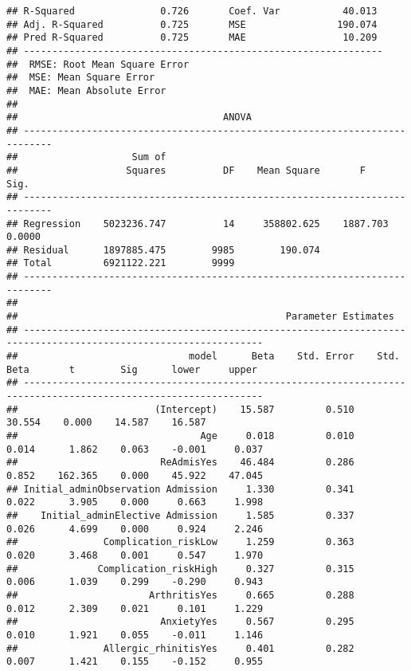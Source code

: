 \documentclass[
]{article}
\begin{document}
\begin{verbatim}
## R-Squared               0.726       Coef. Var           40.013 
## Adj. R-Squared          0.725       MSE                190.074 
## Pred R-Squared          0.725       MAE                 10.209 
## ---------------------------------------------------------------
##  RMSE: Root Mean Square Error 
##  MSE: Mean Square Error 
##  MAE: Mean Absolute Error 
## 
##                                    ANOVA                                    
## ---------------------------------------------------------------------------
##                    Sum of                                                  
##                   Squares          DF    Mean Square       F          Sig. 
## ---------------------------------------------------------------------------
## Regression    5023236.747          14     358802.625    1887.703    0.0000 
## Residual      1897885.475        9985        190.074                       
## Total         6921122.221        9999                                      
## ---------------------------------------------------------------------------
## 
##                                               Parameter Estimates                                                
## ----------------------------------------------------------------------------------------------------------------
##                              model      Beta    Std. Error    Std. Beta       t        Sig      lower     upper 
## ----------------------------------------------------------------------------------------------------------------
##                        (Intercept)    15.587         0.510                  30.554    0.000    14.587    16.587 
##                                Age     0.018         0.010        0.014      1.862    0.063    -0.001     0.037 
##                         ReAdmisYes    46.484         0.286        0.852    162.365    0.000    45.922    47.045 
## Initial_adminObservation Admission     1.330         0.341        0.022      3.905    0.000     0.663     1.998 
##    Initial_adminElective Admission     1.585         0.337        0.026      4.699    0.000     0.924     2.246 
##               Complication_riskLow     1.259         0.363        0.020      3.468    0.001     0.547     1.970 
##              Complication_riskHigh     0.327         0.315        0.006      1.039    0.299    -0.290     0.943 
##                       ArthritisYes     0.665         0.288        0.012      2.309    0.021     0.101     1.229 
##                         AnxietyYes     0.567         0.295        0.010      1.921    0.055    -0.011     1.146 
##               Allergic_rhinitisYes     0.401         0.282        0.007      1.421    0.155    -0.152     0.955 

\end{verbatim}
\end{document}
